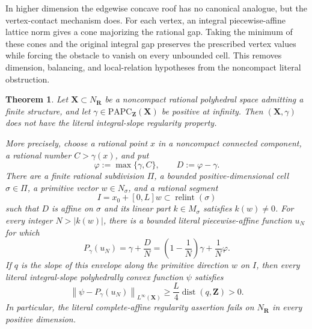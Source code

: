 \documentclass[11pt,a4paper]{article}
\newtheorem{theorem}{Theorem}[section]
\theoremstyle{definition}
\theoremstyle{remark}
\begin{document}
In higher dimension the edgewise concave roof has no canonical analogue, but
the vertex-contact mechanism does.  For each vertex, an integral
piecewise-affine lattice norm gives a cone majorizing the rational gap.
Taking the minimum of these cones and the original integral gap preserves
the prescribed vertex values while forcing the obstacle to vanish on every
unbounded cell.  This removes dimension, balancing, and local-relation
hypotheses from the noncompact literal obstruction.



\begin{theorem}
\label{thm:frontier-polyhedral-noncompact-literal-nonregularity}
Let $\mathbf X\subset N_{\mathbf R}$ be a noncompact rational polyhedral
space admitting a finite structure, and let
$\gamma\in\mathrm{PAPC}_{\mathbf Z}(\mathbf X)$ be positive at infinity.
Then $(\mathbf X,\gamma)$ does not have the literal integral-slope
regularity property.

More precisely, choose a rational point $x$ in a noncompact connected
component, a rational number $C>\gamma(x)$, and put
\[
                 \varphi:=\max\{\gamma,C\},
                 \qquad D:=\varphi-\gamma.
\]
There are a finite rational subdivision $\Pi$, a bounded positive-dimensional
cell $\sigma\in\Pi$, a primitive vector $w\in N_\sigma$, and a rational
segment
\[
             I=x_0+[0,L]w\subset\operatorname{relint}(\sigma)
\]
such that $D$ is affine on $\sigma$ and its linear part $k\in M_\sigma$
satisfies $k(w)\neq0$.  For every integer $N>|k(w)|$, there is a bounded
literal piecewise-affine function $u_N$ for which
\begin{equation}
 P_\gamma(u_N)
 =\gamma+\frac{D}{N}
 =\left(1-\frac1N\right)\gamma+\frac1N\varphi.
 \label{eq:frontier-polyhedral-noncompact-literal-envelope}
\end{equation}
If $q$ is the slope of this envelope along the primitive direction $w$ on
$I$, then every literal integral-slope polyhedrally convex function $\psi$
satisfies
\begin{equation}
 \left\lVert\psi-P_\gamma(u_N)\right\rVert_{L^\infty(\mathbf X)}
 \geq \frac{L}{4}\operatorname{dist}(q,\mathbf Z)>0.
 \label{eq:frontier-polyhedral-noncompact-literal-separation}
\end{equation}
In particular, the literal complete-affine regularity assertion fails on
$N_{\mathbf R}$ in every positive dimension.
\end{theorem}
\end{document}
